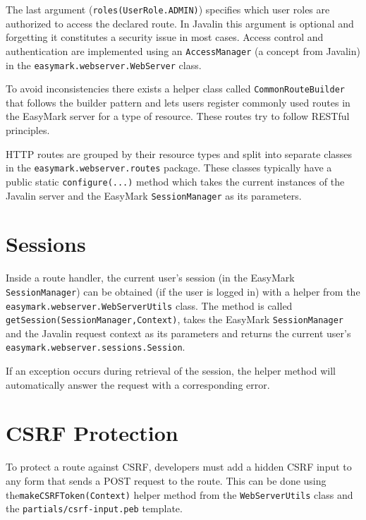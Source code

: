 \documentclass[12pt,a4paper]{report}
\begin{document}
	The last argument (\lstinline|roles(UserRole.ADMIN)|) specifies which user roles are authorized to access the declared route. In Javalin this argument is optional and forgetting it constitutes a security issue in most cases. Access control and authentication are implemented using an \lstinline|AccessManager| (a concept from Javalin) in the \lstinline|easymark.webserver.|\linebreak\lstinline|WebServer| class.
	
	To avoid inconsistencies there exists a helper class called \lstinline|CommonRouteBuilder| that follows the builder pattern and lets users register commonly used routes in the EasyMark server for a type of resource. These routes try to follow RESTful principles.
	
	HTTP routes are grouped by their resource types and split into separate classes in the \lstinline|easymark.webserver.routes| package. These classes typically have a public static \lstinline|configure(...)| method which takes the current instances of the Javalin server and the EasyMark \lstinline|SessionManager| as its parameters.
	
	\section{Sessions}
	Inside a route handler, the current user's session (in the EasyMark \lstinline|SessionManager|) can be obtained (if the user is logged in) with a helper from the \lstinline|easymark.webserver.|\linebreak\lstinline|WebServerUtils| class. The method is called \lstinline|getSession(SessionManager,|\linebreak\lstinline|Context)|, takes the EasyMark \lstinline|SessionManager| and the Javalin request context as its parameters and returns the current user's \lstinline|easymark.webserver.sessions.Session|.
	
	If an exception occurs during retrieval of the session, the helper method will automatically answer the request with a corresponding error.
	
	\section{CSRF Protection}
	To protect a route against CSRF, developers must add a hidden CSRF input to any form that sends a POST request to the route. This can be done using the\linebreak\lstinline|makeCSRFToken(Context)| helper method from the \lstinline|WebServerUtils| class and the \lstinline|partials/csrf-input.peb| template.
	
\end{document}
